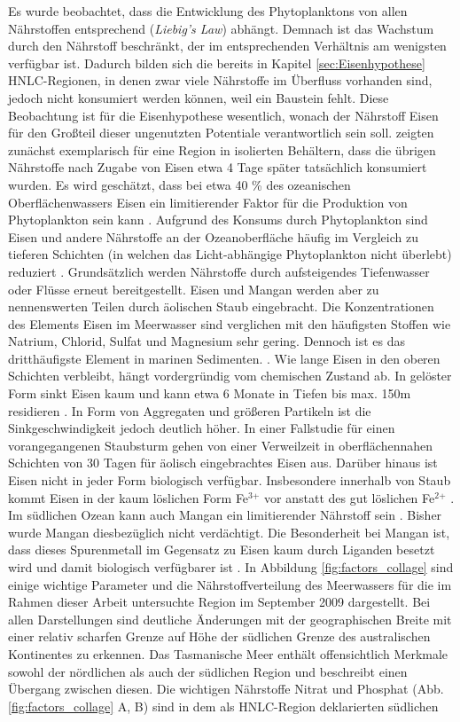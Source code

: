 \documentclass[12pt,a4paper,onecolumn]{scrartcl}
\begin{document}
Es wurde beobachtet, dass die Entwicklung des Phytoplanktons von allen Nährstoffen entsprechend (\textit{Liebig's Law}) abhängt. Demnach ist das Wachstum durch den Nährstoff beschränkt, der im entsprechenden Verhältnis am wenigsten verfügbar ist. Dadurch bilden sich die bereits in Kapitel \ref{sec:Eisenhypothese} HNLC-Regionen, in denen zwar viele Nährstoffe im Überfluss vorhanden sind, jedoch nicht konsumiert werden können, weil ein Baustein fehlt. Diese Beobachtung ist für die Eisenhypothese wesentlich, wonach der Nährstoff Eisen für den Großteil dieser ungenutzten Potentiale verantwortlich sein soll. \citet{Martin.1988} zeigten zunächst exemplarisch für eine Region in isolierten Behältern, dass die übrigen Nährstoffe nach Zugabe von Eisen etwa 4 Tage später tatsächlich konsumiert wurden. Es wird geschätzt, dass bei etwa 40 \% des ozeanischen Oberflächenwassers Eisen ein limitierender Faktor für die Produktion von Phytoplankton sein kann \citep{Emerson.2009}. Aufgrund des Konsums durch Phytoplankton sind Eisen und andere Nährstoffe an der Ozeanoberfläche häufig im Vergleich zu tieferen Schichten (in welchen das Licht-abhängige Phytoplankton nicht überlebt) reduziert \citep{Martin.1990}. Grundsätzlich werden Nährstoffe durch aufsteigendes Tiefenwasser oder Flüsse erneut bereitgestellt. Eisen und Mangan werden aber zu nennenswerten Teilen durch äolischen Staub eingebracht. Die Konzentrationen des Elements Eisen im Meerwasser sind verglichen mit den häufigsten Stoffen wie Natrium, Chlorid, Sulfat und Magnesium sehr gering. Dennoch ist es das dritthäufigste Element in marinen Sedimenten. \citep{Emerson.2009}. Wie lange Eisen in den oberen Schichten verbleibt, hängt vordergründig vom chemischen Zustand ab. In gelöster Form sinkt Eisen kaum und kann etwa 6 Monate in Tiefen bis max. 150m residieren \citep{Hayes.2015}. In Form von Aggregaten und größeren Partikeln ist die Sinkgeschwindigkeit jedoch deutlich höher. In einer Fallstudie für einen vorangegangenen Staubsturm gehen \citet{Boyd.2010} von einer Verweilzeit in oberflächennahen Schichten von 30 Tagen für äolisch eingebrachtes Eisen aus. Darüber hinaus ist Eisen nicht in jeder Form biologisch verfügbar. Insbesondere innerhalb von Staub kommt Eisen in der kaum löslichen Form Fe$^\text{3+}$ vor anstatt des gut löslichen Fe$^\text{2+}$ \citep{Reynolds.2014}. Im südlichen Ozean kann auch Mangan ein limitierender Nährstoff sein \citep{Browning.2021}. Bisher wurde Mangan diesbezüglich nicht verdächtigt. Die Besonderheit bei Mangan ist, dass dieses Spurenmetall im Gegensatz zu Eisen kaum durch Liganden besetzt wird und damit biologisch verfügbarer ist \citep{Emerson.2009}. In Abbildung \ref{fig:factors_collage} sind einige wichtige Parameter und die Nährstoffverteilung des Meerwassers für die im Rahmen dieser Arbeit untersuchte Region im September 2009 dargestellt. Bei allen Darstellungen sind deutliche Änderungen mit der geographischen Breite mit einer relativ scharfen Grenze auf Höhe der südlichen Grenze des australischen Kontinentes zu erkennen. Das Tasmanische Meer enthält offensichtlich Merkmale sowohl der nördlichen als auch der südlichen Region und beschreibt einen Übergang zwischen diesen. Die wichtigen Nährstoffe Nitrat und Phosphat (Abb. \ref{fig:factors_collage} A, B) sind in dem als HNLC-Region deklarierten südlichen 
\end{document}
